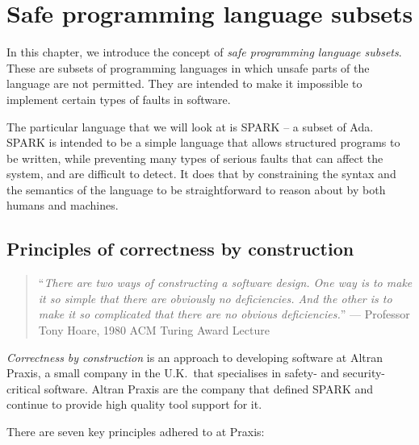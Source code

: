 \chapter{Safe programming language subsets}
\label{chapter:spark}

\lstset{aboveskip=3mm}

In this chapter, we introduce the concept of \emph{safe programming language subsets}. These are subsets of programming languages in which unsafe parts of the language are not permitted. They are intended to make it impossible to implement certain types of faults in software.

The particular language that we will look at is SPARK -- a subset of Ada. SPARK is intended to be a simple language that allows structured programs to be written, while preventing many types of serious faults that can affect the system, and are difficult to detect. It does that by constraining the syntax and the semantics of the language to be straightforward to reason about by both humans and machines.


\section{Principles of correctness by construction}

\begin{quote}
``\emph{There are two ways of constructing a software design. One way is to make it so simple that there are obviously no deficiencies. And the other is to make it so complicated that there are no obvious deficiencies.}'' --- \textnormal{Professor Tony Hoare, 1980 ACM Turing Award Lecture}
\end{quote}

{\em Correctness by construction} is an approach to developing software at Altran Praxis, a small company in the U.K.\ that specialises in safety- and security-critical software. Altran Praxis are the company that defined SPARK and continue to provide high quality tool support for it.

There are seven key principles adhered to at Praxis:

